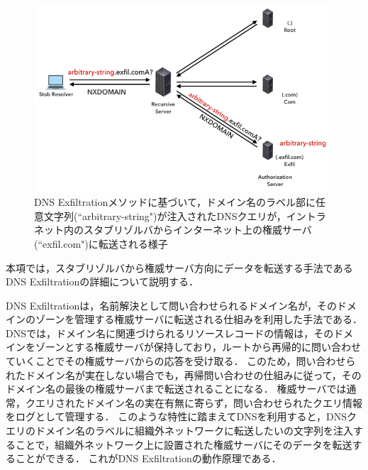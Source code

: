 \begin{figure}[h]
 \centering
 \includegraphics[width=12.0cm]{figure/dns-exfiltration.png}
 \caption{DNS Exfiltrationメソッドに基づいて，ドメイン名のラベル部に任意文字列(``arbitrary-string")が注入されたDNSクエリが，イントラネット内のスタブリゾルバからインターネット上の権威サーバ(``exfil.com")に転送される様子}
 \label{fig:dns-exfiltration}
\end{figure}


本項では，スタブリゾルバから権威サーバ方向にデータを転送する手法であるDNS Exfiltrationの詳細について説明する．

DNS Exfiltrationは，名前解決として問い合わせられるドメイン名が，そのドメインのゾーンを管理する権威サーバに転送される仕組みを利用した手法である．
DNSでは，ドメイン名に関連づけられるリソースレコードの情報は，そのドメインをゾーンとする権威サーバが保持しており，ルートから再帰的に問い合わせていくことでその権威サーバからの応答を受け取る．
このため，問い合わせられたドメイン名が実在しない場合でも，再帰問い合わせの仕組みに従って，そのドメイン名の最後の権威サーバまで転送されることになる．
権威サーバでは通常，クエリされたドメイン名の実在有無に寄らず，問い合わせられたクエリ情報をログとして管理する．
このような特性に踏まえてDNSを利用すると，DNSクエリのドメイン名のラベルに組織外ネットワークに転送したいの文字列を注入することで，組織外ネットワーク上に設置された権威サーバにそのデータを転送することができる．
これがDNS Exfiltrationの動作原理である．

